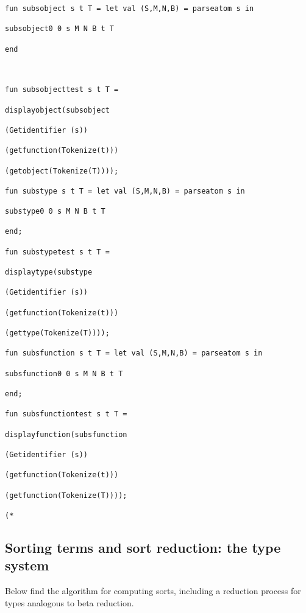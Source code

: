 \documentclass[12pt]{article}
\begin{document}
\begin{verbatim}
fun subsobject s t T = let val (S,M,N,B) = parseatom s in

subsobject0 0 s M N B t T

end



fun subsobjecttest s t T =

displayobject(subsobject

(Getidentifier (s))

(getfunction(Tokenize(t)))

(getobject(Tokenize(T))));

fun substype s t T = let val (S,M,N,B) = parseatom s in

substype0 0 s M N B t T

end;

fun substypetest s t T =

displaytype(substype

(Getidentifier (s))

(getfunction(Tokenize(t)))

(gettype(Tokenize(T))));

fun subsfunction s t T = let val (S,M,N,B) = parseatom s in

subsfunction0 0 s M N B t T

end;

fun subsfunctiontest s t T =

displayfunction(subsfunction

(Getidentifier (s))

(getfunction(Tokenize(t)))

(getfunction(Tokenize(T))));

(*

\end{verbatim}

\newpage

\subsection{Sorting terms and sort reduction:  the type system}

Below find the algorithm for computing sorts, including a reduction process for types
analogous to beta reduction.
\end{document}
